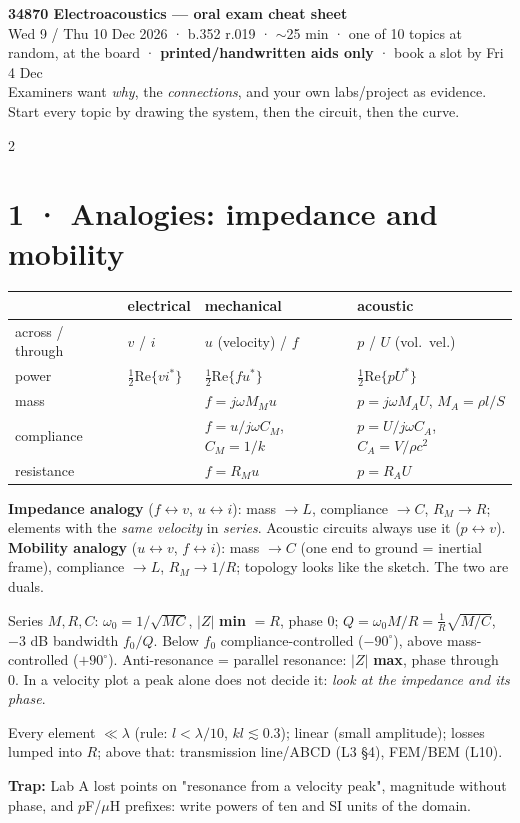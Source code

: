 \documentclass[8pt]{extarticle}
\newcommand{\sub}[1]{\par\smallskip{\bfseries\color{ac}#1}\par}
\newcommand{\trap}[1]{\par{\color{tr}\bfseries Trap:} #1\par}
\begin{document}
\begin{center}{\large\bfseries 34870 Electroacoustics — oral exam cheat sheet}\\[1pt]
\small Wed 9 / Thu 10 Dec 2026 · b.352 r.019 · $\sim$25 min · one of 10 topics at random, at the board · \textbf{printed/handwritten aids only} · book a slot by Fri 4 Dec\\
Examiners want \emph{why}, the \emph{connections}, and your own labs/project as evidence. Start every topic by drawing the system, then the circuit, then the curve.\end{center}
\vspace{-4pt}
\begin{multicols}{2}

\section{1 · Analogies: impedance and mobility}
\begin{tabularx}{\columnwidth}{@{}lXXX@{}}\toprule
 & {\color{el}electrical} & {\color{me}mechanical} & {\color{ac}acoustic}\\\midrule
across / through & $v$ / $i$ & $u$ (velocity) / $f$ & $p$ / $U$ (vol.\ vel.)\\
power & $\tfrac12\mathrm{Re}\{v i^*\}$ & $\tfrac12\mathrm{Re}\{f u^*\}$ & $\tfrac12\mathrm{Re}\{p U^*\}$\\
mass & & $f=j\omega M_M u$ & $p=j\omega M_A U$, $M_A=\rho l/S$\\
compliance & & $f=u/j\omega C_M$, $C_M=1/k$ & $p=U/j\omega C_A$, $C_A=V/\rho c^2$\\
resistance & & $f=R_M u$ & $p=R_A U$\\\bottomrule
\end{tabularx}
\textbf{Impedance analogy} ($f\!\leftrightarrow\! v$, $u\!\leftrightarrow\! i$): mass $\to L$, compliance $\to C$, $R_M\to R$; elements with the \emph{same velocity} in \emph{series}. Acoustic circuits always use it ($p\leftrightarrow v$).
\textbf{Mobility analogy} ($u\!\leftrightarrow\! v$, $f\!\leftrightarrow\! i$): mass $\to C$ (one end to ground = inertial frame), compliance $\to L$, $R_M\to 1/R$; topology looks like the sketch. The two are duals.
\sub{Resonance}
Series $M,R,C$: $\omega_0=1/\sqrt{MC}$, $|Z|$ \textbf{min} $=R$, phase $0$; $Q=\omega_0M/R=\tfrac1R\sqrt{M/C}$, $-3$ dB bandwidth $f_0/Q$. Below $f_0$ compliance-controlled ($-90^\circ$), above mass-controlled ($+90^\circ$).
Anti-resonance = parallel resonance: $|Z|$ \textbf{max}, phase through 0. In a velocity plot a peak alone does not decide it: \emph{look at the impedance and its phase}.
\sub{Limits of lumped models}
Every element $\ll\lambda$ (rule: $l<\lambda/10$, $kl\lesssim0.3$); linear (small amplitude); losses lumped into $R$; above that: transmission line/ABCD (L3 §4), FEM/BEM (L10).
\trap{Lab A lost points on "resonance from a velocity peak", magnitude without phase, and $p$F/$\mu$H prefixes: write powers of ten and SI units of the domain.}


\end{multicols}
\end{document}
